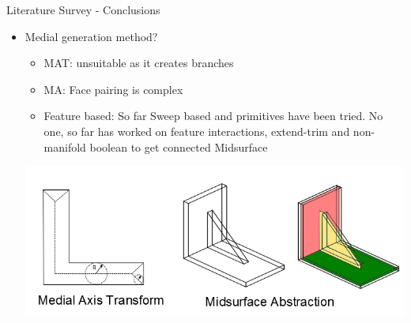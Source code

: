 \begin{frame}[<+-| alert@+>]{Literature Survey - Conclusions}
\begin{itemize}[noitemsep,label=\textbullet,topsep=2pt,parsep=2pt,partopsep=2pt]

\item Medial generation method?
\begin{itemize}[noitemsep,label=\textbullet,topsep=2pt,parsep=2pt,partopsep=2pt]
\item MAT: unsuitable as it creates branches
\item MA: Face pairing is complex
\item Feature based: So far Sweep based and primitives have been tried. No one, so far has worked on feature interactions, extend-trim and non-manifold boolean to get connected Midsurface
\end{itemize}

\includegraphics[scale=0.4]{../Common/images/MAT_Midsurf.png}

\end{itemize}


\end{frame}


